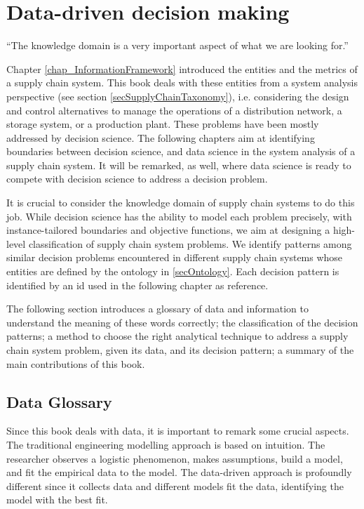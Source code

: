 \chapter{Data-driven decision making}{“The knowledge domain is a very important aspect of what we are looking for.”}



Chapter \ref{chap_InformationFramework} introduced the entities and the metrics of a supply chain system. This book deals with these entities from a system analysis perspective (see section \ref{secSupplyChainTaxonomy}), i.e. considering the design and control alternatives to manage the operations of a distribution network, a storage system, or a production plant. These problems have been mostly addressed by decision science. The following chapters aim at identifying boundaries between decision science, and data science in the system analysis of a supply chain system. It will be remarked, as well, where data science is ready to compete with decision science to address a decision problem.\par

It is crucial to consider the knowledge domain of supply chain systems to do this job. While decision science has the ability to model each problem precisely, with instance-tailored boundaries and objective functions, we aim at designing a high-level classification of supply chain system problems. We identify patterns among similar decision problems encountered in different supply chain systems whose entities are defined by the ontology in \ref{secOntology}. Each decision pattern is identified by an id used in the following chapter as reference.\par

The following section introduces a glossary of data and information to understand the meaning of these words correctly; the classification of the decision patterns; a method to choose the right analytical technique to address a supply chain system problem, given its data, and its decision pattern; a summary of the main contributions of this book.

\section{Data Glossary}

Since this book deals with data, it is important to remark some crucial aspects. The traditional engineering modelling approach is based on intuition. The researcher observes a logistic phenomenon, makes assumptions, build a model, and fit the empirical data to the model. The data-driven approach is profoundly different since it collects data and different models fit the data, identifying the model with the best fit.\par

